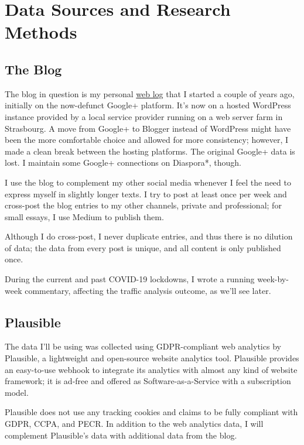 %
%

\pagebreak
\section{Data Sources and Research Methods}

\onehalfspacing

\subsection{The Blog}

The blog in question is my personal \href{https://chfrank.net/wordpress}{web log} that I started a couple of years ago, initially on the now-defunct Google+ platform. It's now on a hosted WordPress instance provided by a local service provider running on a web server farm in Strasbourg. A move from Google+ to Blogger instead of WordPress might have been the more comfortable choice and allowed for more consistency; however, I made a clean break between the hosting platforms. The original Google+ data is lost. I maintain some Google+ connections on Diaspora*, though.

I use the blog to complement my other social media whenever I feel the need to express myself in slightly longer texts. I try to post at least once per week and cross-post the blog entries to my other channels, private and professional; for small essays, I use Medium to publish them.

Although I do cross-post, I never duplicate entries, and thus there is no dilution of data; the data from every post is unique, and all content is only published once.

During the current and past COVID-19 lockdowns, I wrote a running week-by-week commentary, affecting the traffic analysis outcome, as we'll see later.

\subsection{Plausible}

The data I'll be using was collected using GDPR-compliant web analytics by Plausible, a lightweight and open-source website analytics tool. Plausible provides an easy-to-use webhook to integrate its analytics with almost any kind of website framework; it is ad-free and offered as Software-as-a-Service with a subscription model.

Plausible does not use any tracking cookies and claims to be fully compliant with GDPR, CCPA, and PECR. In addition to the web analytics data, I will complement Plausible's data with additional data from the blog.

